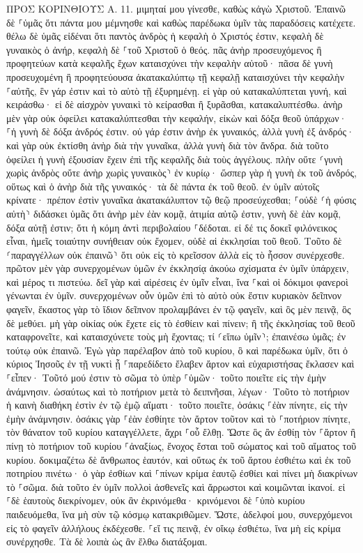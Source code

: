 \documentclass[twoside, 9pt]{extreport}
\begin{document}
ΠΡΟΣ ΚΟΡΙΝΘΙΟΥΣ Α.
11.
μιμηταί μου γίνεσθε, καθὼς κἀγὼ Χριστοῦ. 
Ἐπαινῶ δὲ ⸀ὑμᾶς ὅτι πάντα μου μέμνησθε καὶ καθὼς παρέδωκα ὑμῖν τὰς παραδόσεις κατέχετε. 
θέλω δὲ ὑμᾶς εἰδέναι ὅτι παντὸς ἀνδρὸς ἡ κεφαλὴ ὁ Χριστός ἐστιν, κεφαλὴ δὲ γυναικὸς ὁ ἀνήρ, κεφαλὴ δὲ ⸀τοῦ Χριστοῦ ὁ θεός. 
πᾶς ἀνὴρ προσευχόμενος ἢ προφητεύων κατὰ κεφαλῆς ἔχων καταισχύνει τὴν κεφαλὴν αὐτοῦ· 
πᾶσα δὲ γυνὴ προσευχομένη ἢ προφητεύουσα ἀκατακαλύπτῳ τῇ κεφαλῇ καταισχύνει τὴν κεφαλὴν ⸀αὐτῆς, ἓν γάρ ἐστιν καὶ τὸ αὐτὸ τῇ ἐξυρημένῃ. 
εἰ γὰρ οὐ κατακαλύπτεται γυνή, καὶ κειράσθω· εἰ δὲ αἰσχρὸν γυναικὶ τὸ κείρασθαι ἢ ξυρᾶσθαι, κατακαλυπτέσθω. 
ἀνὴρ μὲν γὰρ οὐκ ὀφείλει κατακαλύπτεσθαι τὴν κεφαλήν, εἰκὼν καὶ δόξα θεοῦ ὑπάρχων· ⸀ἡ γυνὴ δὲ δόξα ἀνδρός ἐστιν. 
οὐ γάρ ἐστιν ἀνὴρ ἐκ γυναικός, ἀλλὰ γυνὴ ἐξ ἀνδρός· 
καὶ γὰρ οὐκ ἐκτίσθη ἀνὴρ διὰ τὴν γυναῖκα, ἀλλὰ γυνὴ διὰ τὸν ἄνδρα. 
διὰ τοῦτο ὀφείλει ἡ γυνὴ ἐξουσίαν ἔχειν ἐπὶ τῆς κεφαλῆς διὰ τοὺς ἀγγέλους. 
πλὴν οὔτε ⸂γυνὴ χωρὶς ἀνδρὸς οὔτε ἀνὴρ χωρὶς γυναικὸς⸃ ἐν κυρίῳ· 
ὥσπερ γὰρ ἡ γυνὴ ἐκ τοῦ ἀνδρός, οὕτως καὶ ὁ ἀνὴρ διὰ τῆς γυναικός· τὰ δὲ πάντα ἐκ τοῦ θεοῦ. 
ἐν ὑμῖν αὐτοῖς κρίνατε· πρέπον ἐστὶν γυναῖκα ἀκατακάλυπτον τῷ θεῷ προσεύχεσθαι; 
⸀οὐδὲ ⸂ἡ φύσις αὐτὴ⸃ διδάσκει ὑμᾶς ὅτι ἀνὴρ μὲν ἐὰν κομᾷ, ἀτιμία αὐτῷ ἐστιν, 
γυνὴ δὲ ἐὰν κομᾷ, δόξα αὐτῇ ἐστιν; ὅτι ἡ κόμη ἀντὶ περιβολαίου ⸀δέδοται. 
εἰ δέ τις δοκεῖ φιλόνεικος εἶναι, ἡμεῖς τοιαύτην συνήθειαν οὐκ ἔχομεν, οὐδὲ αἱ ἐκκλησίαι τοῦ θεοῦ. 
Τοῦτο δὲ ⸂παραγγέλλων οὐκ ἐπαινῶ⸃ ὅτι οὐκ εἰς τὸ κρεῖσσον ἀλλὰ εἰς τὸ ἧσσον συνέρχεσθε. 
πρῶτον μὲν γὰρ συνερχομένων ὑμῶν ἐν ἐκκλησίᾳ ἀκούω σχίσματα ἐν ὑμῖν ὑπάρχειν, καὶ μέρος τι πιστεύω. 
δεῖ γὰρ καὶ αἱρέσεις ἐν ὑμῖν εἶναι, ἵνα ⸀καὶ οἱ δόκιμοι φανεροὶ γένωνται ἐν ὑμῖν. 
συνερχομένων οὖν ὑμῶν ἐπὶ τὸ αὐτὸ οὐκ ἔστιν κυριακὸν δεῖπνον φαγεῖν, 
ἕκαστος γὰρ τὸ ἴδιον δεῖπνον προλαμβάνει ἐν τῷ φαγεῖν, καὶ ὃς μὲν πεινᾷ, ὃς δὲ μεθύει. 
μὴ γὰρ οἰκίας οὐκ ἔχετε εἰς τὸ ἐσθίειν καὶ πίνειν; ἢ τῆς ἐκκλησίας τοῦ θεοῦ καταφρονεῖτε, καὶ καταισχύνετε τοὺς μὴ ἔχοντας; τί ⸂εἴπω ὑμῖν⸃; ἐπαινέσω ὑμᾶς; ἐν τούτῳ οὐκ ἐπαινῶ. 
Ἐγὼ γὰρ παρέλαβον ἀπὸ τοῦ κυρίου, ὃ καὶ παρέδωκα ὑμῖν, ὅτι ὁ κύριος Ἰησοῦς ἐν τῇ νυκτὶ ᾗ ⸀παρεδίδετο ἔλαβεν ἄρτον 
καὶ εὐχαριστήσας ἔκλασεν καὶ ⸀εἶπεν· Τοῦτό μού ἐστιν τὸ σῶμα τὸ ὑπὲρ ⸀ὑμῶν· τοῦτο ποιεῖτε εἰς τὴν ἐμὴν ἀνάμνησιν. 
ὡσαύτως καὶ τὸ ποτήριον μετὰ τὸ δειπνῆσαι, λέγων· Τοῦτο τὸ ποτήριον ἡ καινὴ διαθήκη ἐστὶν ἐν τῷ ἐμῷ αἵματι· τοῦτο ποιεῖτε, ὁσάκις ⸀ἐὰν πίνητε, εἰς τὴν ἐμὴν ἀνάμνησιν. 
ὁσάκις γὰρ ⸀ἐὰν ἐσθίητε τὸν ἄρτον τοῦτον καὶ τὸ ⸀ποτήριον πίνητε, τὸν θάνατον τοῦ κυρίου καταγγέλλετε, ἄχρι ⸀οὗ ἔλθῃ. 
Ὥστε ὃς ἂν ἐσθίῃ τὸν ⸀ἄρτον ἢ πίνῃ τὸ ποτήριον τοῦ κυρίου ⸀ἀναξίως, ἔνοχος ἔσται τοῦ σώματος καὶ τοῦ αἵματος τοῦ κυρίου. 
δοκιμαζέτω δὲ ἄνθρωπος ἑαυτόν, καὶ οὕτως ἐκ τοῦ ἄρτου ἐσθιέτω καὶ ἐκ τοῦ ποτηρίου πινέτω· 
ὁ γὰρ ἐσθίων καὶ ⸀πίνων κρίμα ἑαυτῷ ἐσθίει καὶ πίνει μὴ διακρίνων τὸ ⸀σῶμα. 
διὰ τοῦτο ἐν ὑμῖν πολλοὶ ἀσθενεῖς καὶ ἄρρωστοι καὶ κοιμῶνται ἱκανοί. 
εἰ ⸀δὲ ἑαυτοὺς διεκρίνομεν, οὐκ ἂν ἐκρινόμεθα· 
κρινόμενοι δὲ ⸀ὑπὸ κυρίου παιδευόμεθα, ἵνα μὴ σὺν τῷ κόσμῳ κατακριθῶμεν. 
Ὥστε, ἀδελφοί μου, συνερχόμενοι εἰς τὸ φαγεῖν ἀλλήλους ἐκδέχεσθε. 
⸀εἴ τις πεινᾷ, ἐν οἴκῳ ἐσθιέτω, ἵνα μὴ εἰς κρίμα συνέρχησθε. Τὰ δὲ λοιπὰ ὡς ἂν ἔλθω διατάξομαι. 
\end{document}
